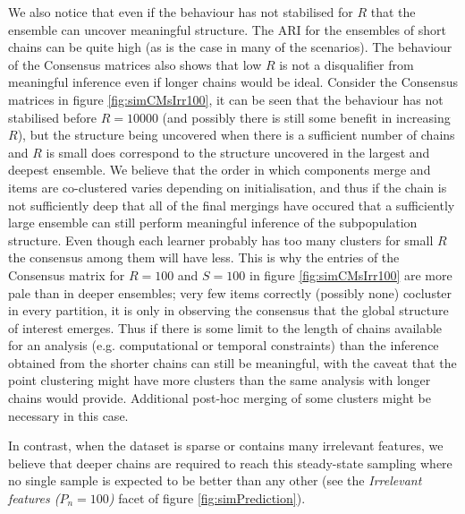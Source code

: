 \documentclass[]{article}
\begin{document}
We also notice that even if the behaviour has not stabilised for $R$ that the ensemble can uncover meaningful structure. The ARI for the ensembles of short chains can be quite high (as is the case in many of the scenarios). The behaviour of the Consensus matrices also shows that low $R$ is not a disqualifier from meaningful inference even if longer chains would be ideal. Consider the Consensus matrices in figure \ref{fig:simCMsIrr100}, it can be seen that the behaviour has not stabilised before $R=10000$ (and possibly there is still some benefit in increasing $R$), but the structure being uncovered when there is a sufficient number of chains and $R$ is small does correspond to the structure uncovered in the largest and deepest ensemble. We believe that the order in which components merge and items are co-clustered varies depending on initialisation, and thus if the chain is not sufficiently deep that all of the final mergings have occured that a sufficiently large ensemble can still perform meaningful inference of the subpopulation structure. Even though each learner probably has too many clusters for small $R$ the consensus among them will have less. This is why the entries of the Consensus matrix for $R=100$ and $S=100$ in figure \ref{fig:simCMsIrr100} are more pale than in deeper ensembles; very few items correctly (possibly none) cocluster in every partition, it is only in observing the consensus that the global structure of interest emerges. Thus if there is some limit to the length of chains available for an analysis (e.g. computational or temporal constraints) than the inference obtained from the shorter chains can still be meaningful, with the caveat that the point clustering might have more clusters than the same analysis with longer chains would provide. Additional post-hoc merging of some clusters might be necessary in this case.

In contrast, when the dataset is sparse or contains many irrelevant features, we believe that deeper chains are required to reach this steady-state sampling where no single sample is expected to be better than any other (see the \emph{Irrelevant features ($P_n = 100$)} facet of figure \ref{fig:simPrediction}).
\end{document}
